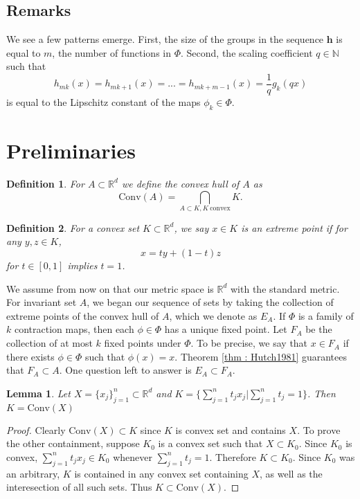\documentclass [52pt] {article}
\newcommand{\R}{\mathbb{R}}
\newcommand{\N}{\mathbb{N}}
\newcommand{\conv}{\text{Conv}}
\newtheorem{lemma}{Lemma}
\newtheorem{definition}{Definition}
\begin{document}
\subsection{Remarks}

We see a few patterns emerge.  First, the size of the groups in the sequence $\mathbf{h}$ is equal to $m$, the number of functions in $\Phi$.  Second, the scaling coefficient $q\in\N$ such that
\[h_{mk}(x) = h_{mk+1}(x) = ...= h_{mk+m-1}(x) = \frac{1}{q} g_k(qx)\]
is equal to the Lipschitz constant of the maps $\phi_k\in\Phi$. 

\section{Preliminaries}

\begin{definition}
For $A\subset\R^d$ we define the convex hull of $A$ as
\[\conv(A) = \bigcap_{A\subset K,K\:\text{convex}} K.\]
\end{definition}

\begin{definition}
For a convex set $K\subset \R^d$, we say $x\in K$ is an extreme point if for any $y,z\in K$, 
\[x = ty+(1-t)z\]
for $t\in[0,1]$ implies $t = 1$.
\end{definition}
We assume from now on that our metric space is $\R^d$ with the standard metric.  For invariant set $A$, we began our sequence of sets by taking the collection of extreme points of the convex hull of $A$, which we denote as $E_A$.  If $\Phi$ is a family of $k$ contraction maps, then each $\phi\in\Phi$ has a unique fixed point.  Let $F_A$ be the collection of at most $k$ fixed points under $\Phi$.  To be precise, we say that $x\in F_A$ if there exists $\phi\in\Phi$ such that $\phi(x) = x$.  Theorem \ref{thm : Hutch1981} guarantees that $F_A \subset A$.  One question left to answer is $E_A\subset F_A$.  

\begin{lemma}\label{lemma : conv_def}
Let $X = \{x_j\}_{j=1}^n\subset \R^d$ and $K = \{\sum_{j=1}^nt_jx_j|\sum_{j=1}^n t_j = 1\}$.  Then $K = \conv(X)$
\end{lemma} 
\begin{proof}
Clearly $\conv(X)\subset K$ since $K$ is convex set and contains $X$.  To prove the other containment, suppose $K_0$ is a convex set such that $X\subset K_0$.  Since $K_0$ is convex, $\sum_{j=1}^nt_jx_j \in K_0$ whenever $\sum_{j = 1}^n t_j = 1$.  Therefore $K\subset K_0$.  Since $K_0$ was an arbitrary, $K$ is contained in any convex set containing $X$, as well as the interesection of all such sets.  Thus $K\subset \conv(X)$.
\end{proof}
\end{document}
